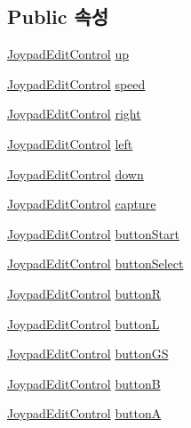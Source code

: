 \subsection*{Public 속성}
\begin{DoxyCompactItemize}
\item 
\mbox{\hyperlink{class_joypad_edit_control}{Joypad\+Edit\+Control}} \mbox{\hyperlink{class_joypad_config_a65379815cbe3f6b1d63d6d6655be22dd}{up}}
\item 
\mbox{\hyperlink{class_joypad_edit_control}{Joypad\+Edit\+Control}} \mbox{\hyperlink{class_joypad_config_a57365c2b56d24e6cf20d3586d692583d}{speed}}
\item 
\mbox{\hyperlink{class_joypad_edit_control}{Joypad\+Edit\+Control}} \mbox{\hyperlink{class_joypad_config_ae941e8b6868e423b3c2bf4313c3c340f}{right}}
\item 
\mbox{\hyperlink{class_joypad_edit_control}{Joypad\+Edit\+Control}} \mbox{\hyperlink{class_joypad_config_a99c36e2559ce17f64aa004c37c5f8771}{left}}
\item 
\mbox{\hyperlink{class_joypad_edit_control}{Joypad\+Edit\+Control}} \mbox{\hyperlink{class_joypad_config_ad42ffdfc61bb990382b0a35d15909644}{down}}
\item 
\mbox{\hyperlink{class_joypad_edit_control}{Joypad\+Edit\+Control}} \mbox{\hyperlink{class_joypad_config_a82881a0174178e60d0a60a2b574fd385}{capture}}
\item 
\mbox{\hyperlink{class_joypad_edit_control}{Joypad\+Edit\+Control}} \mbox{\hyperlink{class_joypad_config_a9083bf057d36c0fd78fe1976bee9fb74}{button\+Start}}
\item 
\mbox{\hyperlink{class_joypad_edit_control}{Joypad\+Edit\+Control}} \mbox{\hyperlink{class_joypad_config_a79baa8f4d47b02dde3f032961e239556}{button\+Select}}
\item 
\mbox{\hyperlink{class_joypad_edit_control}{Joypad\+Edit\+Control}} \mbox{\hyperlink{class_joypad_config_ae8492d5da1c116da58dbaecc7572576b}{buttonR}}
\item 
\mbox{\hyperlink{class_joypad_edit_control}{Joypad\+Edit\+Control}} \mbox{\hyperlink{class_joypad_config_a5a03e1bd6ea571aeeadfbaee7362830f}{buttonL}}
\item 
\mbox{\hyperlink{class_joypad_edit_control}{Joypad\+Edit\+Control}} \mbox{\hyperlink{class_joypad_config_a4aa48681f17e03adced442271f29211f}{button\+GS}}
\item 
\mbox{\hyperlink{class_joypad_edit_control}{Joypad\+Edit\+Control}} \mbox{\hyperlink{class_joypad_config_a8600f90f1074cda2ff14b73e6fc8e3d6}{buttonB}}
\item 
\mbox{\hyperlink{class_joypad_edit_control}{Joypad\+Edit\+Control}} \mbox{\hyperlink{class_joypad_config_a8b18405a6d92fbdca34cb1d1a6fcee2c}{buttonA}}
\end{DoxyCompactItemize}
